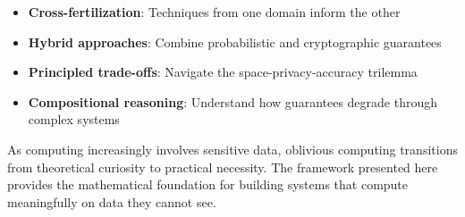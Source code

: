 \documentclass[11pt,final]{article}
\begin{document}
\begin{itemize}
    \item \textbf{Cross-fertilization}: Techniques from one domain inform the other
    \item \textbf{Hybrid approaches}: Combine probabilistic and cryptographic guarantees
    \item \textbf{Principled trade-offs}: Navigate the space-privacy-accuracy trilemma
    \item \textbf{Compositional reasoning}: Understand how guarantees degrade through complex systems
\end{itemize}

As computing increasingly involves sensitive data, oblivious computing transitions from theoretical curiosity to practical necessity. The framework presented here provides the mathematical foundation for building systems that compute meaningfully on data they cannot see.


\end{document}
